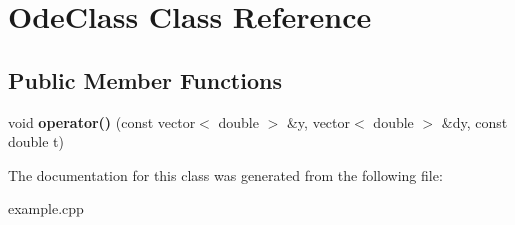 \hypertarget{class_ode_class}{\section{Ode\-Class Class Reference}
\label{class_ode_class}
}
\subsection*{Public Member Functions}
\begin{DoxyCompactItemize}
\item 
\hypertarget{class_ode_class_aa366699f76a0d9dd10934484a838fd74}{void {\bfseries operator()} (const vector$<$ double $>$ \&y, vector$<$ double $>$ \&dy, const double t)}\label{class_ode_class_aa366699f76a0d9dd10934484a838fd74}

\end{DoxyCompactItemize}


The documentation for this class was generated from the following file\-:\begin{DoxyCompactItemize}
\item 
example.\-cpp\end{DoxyCompactItemize}
